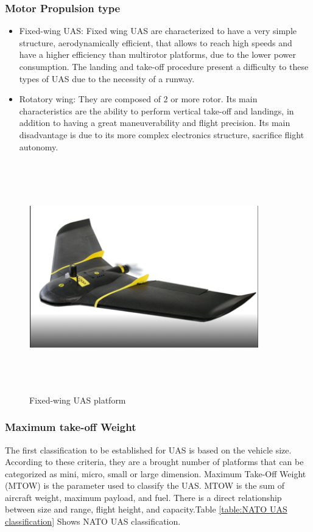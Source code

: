 \subsubsection{Motor Propulsion type}
\begin{itemize}
\item Fixed-wing UAS: Fixed wing UAS are characterized to have a very simple structure, aerodynamically efficient, that allows to reach high speeds and have a higher efficiency than multirotor platforms, due to the lower power consumption. The landing and take-off procedure present a difficulty to these types of UAS due to the necessity of a runway.
\item Rotatory wing: They are composed of 2 or more rotor. Its main characteristics are the ability to perform vertical take-off and landings, in addition to having a great maneuverability and flight precision. Its main disadvantage is due to its more complex electronics structure, sacrifice flight autonomy.\cite{Luis_Fernadno}
\end{itemize}
\begin{figure}[H]
\centering
\includegraphics[width=10cm,height=10cm,keepaspectratio]{imagenes/eBee.PNG}
\caption{Fixed-wing UAS platform}
\label{fig:fixed-wing_UAS}
\end{figure}

\subsubsection{Maximum take-off Weight}
The first classification to be established for UAS is based on the vehicle size. According to these criteria, they are a brought number of platforms that can be categorized as mini, micro, small or large dimension. Maximum Take-Off Weight (MTOW) is the parameter used to classify the UAS. MTOW is the sum of aircraft weight, maximum payload, and fuel. There is a direct relationship between size and range, flight height, and capacity.Table \ref{table:NATO UAS classification} Shows NATO UAS classification.

